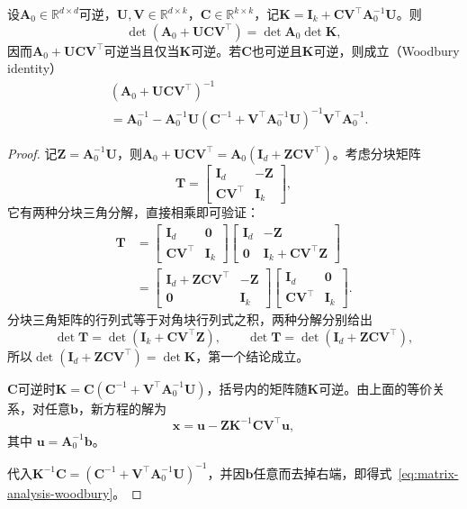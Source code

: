\begin{theorem}[Woodbury恒等式]
\label{thm:ls-woodbury}
设$\bm A_0\in\mathbb R^{d\times d}$可逆，$\bm U,\bm V\in\mathbb R^{d\times k}$，$\bm C\in\mathbb R^{k\times k}$，记$\bm K=\bm I_k+\bm C\bm V^\top\bm A_0^{-1}\bm U$。则
\begin{equation}
 \det(\bm A_0+\bm U\bm C\bm V^\top)=\det\bm A_0\det\bm K,
 \label{eq:ls-woodbury-determinant}
\end{equation}
因而$\bm A_0+\bm U\bm C\bm V^\top$可逆当且仅当$\bm K$可逆。若$\bm C$也可逆且$\bm K$可逆，则成立（Woodbury identity）
\begin{equation}
\begin{aligned}
 &(\bm A_0+\bm U\bm C\bm V^\top)^{-1}\\
 &=\bm A_0^{-1}-\bm A_0^{-1}\bm U
 (\bm C^{-1}+\bm V^\top\bm A_0^{-1}\bm U)^{-1}
 \bm V^\top\bm A_0^{-1}.
\end{aligned}
\label{eq:matrix-analysis-woodbury}
\end{equation}
\end{theorem}
\begin{proof}
记$\bm Z=\bm A_0^{-1}\bm U$，则$\bm A_0+\bm U\bm C\bm V^\top=\bm A_0(\bm I_d+\bm Z\bm C\bm V^\top)$。考虑分块矩阵
\[
 \bm T=\begin{bmatrix}\bm I_d&-\bm Z\\\bm C\bm V^\top&\bm I_k\end{bmatrix},
\]
它有两种分块三角分解，直接相乘即可验证：
\[
 \begin{aligned}
 \bm T&=\begin{bmatrix}\bm I_d&\bm0\\\bm C\bm V^\top&\bm I_k\end{bmatrix}
 \begin{bmatrix}\bm I_d&-\bm Z\\\bm0&\bm I_k+\bm C\bm V^\top\bm Z\end{bmatrix}\\
 &=\begin{bmatrix}\bm I_d+\bm Z\bm C\bm V^\top&-\bm Z\\\bm0&\bm I_k\end{bmatrix}
 \begin{bmatrix}\bm I_d&\bm0\\\bm C\bm V^\top&\bm I_k\end{bmatrix}.
 \end{aligned}
\]
分块三角矩阵的行列式等于对角块行列式之积，两种分解分别给出
\[
 \det\bm T=\det(\bm I_k+\bm C\bm V^\top\bm Z),\qquad
 \det\bm T=\det(\bm I_d+\bm Z\bm C\bm V^\top),
\]
所以$\det(\bm I_d+\bm Z\bm C\bm V^\top)=\det\bm K$，第一个结论成立。

$\bm C$可逆时$\bm K=\bm C(\bm C^{-1}+\bm V^\top\bm A_0^{-1}\bm U)$，括号内的矩阵随$\bm K$可逆。由上面的等价关系，对任意$\bm b$，新方程的解为
\[
  \bm x=\bm u-\bm Z\bm K^{-1}\bm C\bm V^\top\bm u ,
\]
其中
$\bm u=\bm A_0^{-1}\bm b$。

代入$\bm K^{-1}\bm C=(\bm C^{-1}+\bm V^\top\bm A_0^{-1}\bm U)^{-1}$，并因$\bm b$任意而去掉右端，即得式~\eqref{eq:matrix-analysis-woodbury}。
\end{proof}

